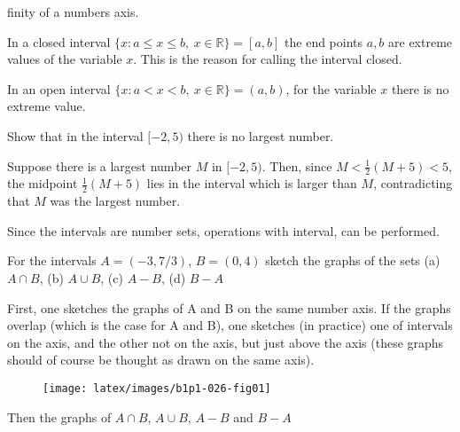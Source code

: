 \documentclass[11pt]{amsbook}
\begin{document}

    \noindent finity of a numbers axis.
    \par In a closed interval $ \{ x: a \leq x \leq b,  \ x \in \mathbb{R} \} = [a, b] $ the end points $a, b$ are extreme values of the variable $x$. This is the reason for calling the interval closed.
    \par In an open interval $ \{ x: a < x < b,\ x \in \mathbb{R} \} = (a,b)$, for the variable $x$ there is no extreme value.
    \begin{exmp}
        Show that in the interval $ [-2, 5) $ there is no largest number.
        \par Suppose there is a largest number $ M $ in  $ [-2, 5) $. Then, since $ M < \frac{1}{2} (M+5) < 5 $, the midpoint $ \frac{1}{2} (M+5) $ lies in the interval which is larger than $ M $, contradicting that  $ M $ was the largest number. 
        \par Since the intervals are number sets, operations with interval, can be performed.
    \end{exmp}

    \begin{exmp}
        For the intervals $ A = (-3, 7/3) $, $ B = (0,4) $ sketch the graphs of the sets (a) $ A \cap B $, (b) $ A \cup B $, (c) $ A-B $, (d) $ B - A $
        \begin{hSolution}
            First, one sketches the graphs of A and B on the same number axis. If the graphs overlap (which is the case for A and B), one sketches (in practice) one of intervals on the axis, and the other not on the axis, but just above the axis (these graphs should of course be thought as drawn on the same axis).
        \end{hSolution}
    \end{exmp}

    \begin{figure}[htb]
	    \texttt{[image: latex/images/b1p1-026-fig01]}
    \end{figure}
    \par Then the graphs of $ A \cap B $, $ A \cup B $, $ A-B $ and $ B-A $
\end{document}
